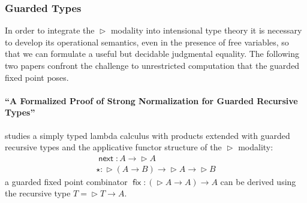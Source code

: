 \documentclass{book}
\DeclareMathOperator{\fix}{\mathsf{fix}}
\DeclareMathOperator{\Later}{\vartriangleright}
\DeclareMathOperator{\next}{\ensuremath{\mathsf{next}}}
\begin{document}

\subsubsection{Guarded Types}

In order to integrate the $\Later$ modality into intensional type
theory it is necessary to develop its operational semantics, even in
the presence of free variables, so that we can formulate a useful but
decidable judgmental equality. The following two papers confront the
challenge to unrestricted computation that the guarded fixed point
poses.

  \paragraph{``A Formalized Proof of Strong Normalization for Guarded Recursive Types''}
  studies a simply typed lambda calculus with products extended with guarded
  recursive types and the applicative functor structure of the $\Later$
  modality:
  \[
  \begin{array}{l}
  \next : A \to \Later A \\
  \star : \Later (A \to B) \to \Later A \to \Later B
  \end{array}
  \]
  a guarded fixed point combinator $\fix : (\Later A \to A) \to
  A$ can be derived using the recursive type $T = \Later T \to A$.
\end{document}
